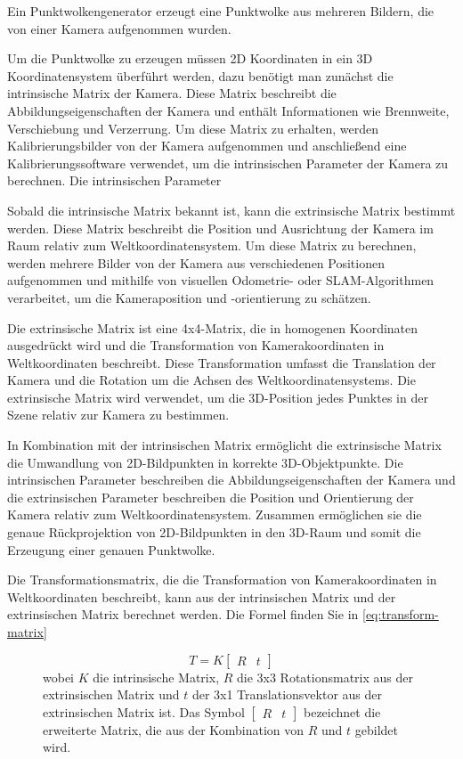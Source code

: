 Ein Punktwolkengenerator erzeugt eine Punktwolke aus mehreren Bildern, die von einer Kamera aufgenommen wurden.

Um die Punktwolke zu erzeugen müssen 2D Koordinaten in ein 3D Koordinatensystem überführt werden, dazu benötigt man zunächst die intrinsische Matrix der Kamera. Diese Matrix beschreibt die Abbildungseigenschaften der Kamera und enthält Informationen wie Brennweite, Verschiebung und Verzerrung. Um diese Matrix zu erhalten, werden Kalibrierungsbilder von der Kamera aufgenommen und anschließend eine Kalibrierungssoftware verwendet, um die intrinsischen Parameter der Kamera zu berechnen. Die intrinsischen Parameter

Sobald die intrinsische Matrix bekannt ist, kann die extrinsische Matrix bestimmt werden. Diese Matrix beschreibt die Position und Ausrichtung der Kamera im Raum relativ zum Weltkoordinatensystem. Um diese Matrix zu berechnen, werden mehrere Bilder von der Kamera aus verschiedenen Positionen aufgenommen und mithilfe von visuellen Odometrie- oder SLAM-Algorithmen verarbeitet, um die Kameraposition und -orientierung zu schätzen.

Die extrinsische Matrix ist eine 4x4-Matrix, die in homogenen Koordinaten ausgedrückt wird und die Transformation von Kamerakoordinaten in Weltkoordinaten beschreibt. Diese Transformation umfasst die Translation der Kamera und die Rotation um die Achsen des Weltkoordinatensystems. Die extrinsische Matrix wird verwendet, um die 3D-Position jedes Punktes in der Szene relativ zur Kamera zu bestimmen.

In Kombination mit der intrinsischen Matrix ermöglicht die extrinsische Matrix die Umwandlung von 2D-Bildpunkten in korrekte 3D-Objektpunkte. Die intrinsischen Parameter beschreiben die Abbildungseigenschaften der Kamera und die extrinsischen Parameter beschreiben die Position und Orientierung der Kamera relativ zum Weltkoordinatensystem. Zusammen ermöglichen sie die genaue Rückprojektion von 2D-Bildpunkten in den 3D-Raum und somit die Erzeugung einer genauen Punktwolke. 

Die Transformationsmatrix, die die Transformation von Kamerakoordinaten in Weltkoordinaten beschreibt, kann aus der intrinsischen Matrix und der extrinsischen Matrix berechnet werden. Die Formel finden Sie in \ref{eq:transform-matrix}

\cite{SWB-470983582}

\begin{figure}
\begin{equation*}
T = K \begin{bmatrix}R & t\end{bmatrix}
\end{equation*}
wobei $K$ die intrinsische Matrix, $R$ die 3x3 Rotationsmatrix aus der extrinsischen Matrix und $t$ der 3x1 Translationsvektor aus der extrinsischen Matrix ist. Das Symbol $\begin{bmatrix}R & t\end{bmatrix}$ bezeichnet die erweiterte Matrix, die aus der Kombination von $R$ und $t$ gebildet wird.
\end{figure}

